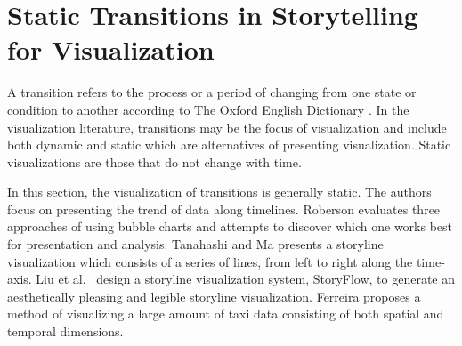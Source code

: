 \documentclass{egpubl}
\begin{document}
\section{Static Transitions in Storytelling for Visualization}
A transition refers to the process or a period of changing from one state or condition to another according to The Oxford English Dictionary \cite{transition}. In the visualization literature, transitions may be the focus of visualization and include both dynamic and static which are alternatives of presenting visualization. Static visualizations are those that do not change with time. 

In this section, the visualization of transitions is generally static. The authors focus on presenting the trend of data along timelines. Roberson \cite{Rebortson} evaluates three approaches of using bubble charts and attempts to discover which one works best for presentation and analysis. Tanahashi and Ma \cite{Tanahashi} presents a storyline visualization which consists of a series of lines, from left to right along the time-axis.  Liu et al.\ \cite{shixia} design a storyline visualization system, StoryFlow, to generate an aesthetically pleasing and legible storyline visualization. Ferreira \cite{ferreira2013} proposes a method of visualizing a large amount of taxi data consisting of both spatial and temporal dimensions.
\end{document}

